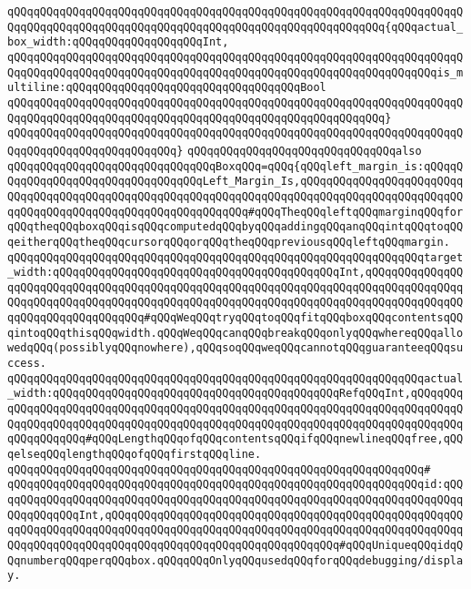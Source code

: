 \verb|qQQqqQQqqQQqqQQqqQQqqQQqqQQqqQQqqQQqqQQqqQQqqQQqqQQqqQQqqQQqqQQqqQQqqQQqqQQqqQQqqQQqqQQqqQQqqQQqqQQqqQQqqQQqqQQqqQQqqQQqqQQqqQQq{qQQqactual_box_width:qQQqqQQqqQQqqQQqqQQqInt,|\newline
\verb|qQQqqQQqqQQqqQQqqQQqqQQqqQQqqQQqqQQqqQQqqQQqqQQqqQQqqQQqqQQqqQQqqQQqqQQqqQQqqQQqqQQqqQQqqQQqqQQqqQQqqQQqqQQqqQQqqQQqqQQqqQQqqQQqqQQqqQQqis_multiline:qQQqqQQqqQQqqQQqqQQqqQQqqQQqqQQqqQQqBool|\newline
\verb|qQQqqQQqqQQqqQQqqQQqqQQqqQQqqQQqqQQqqQQqqQQqqQQqqQQqqQQqqQQqqQQqqQQqqQQqqQQqqQQqqQQqqQQqqQQqqQQqqQQqqQQqqQQqqQQqqQQqqQQqqQQqqQQq}|\newline
\verb|qQQqqQQqqQQqqQQqqQQqqQQqqQQqqQQqqQQqqQQqqQQqqQQqqQQqqQQqqQQqqQQqqQQqqQQqqQQqqQQqqQQqqQQqqQQqqQQq}|\newline
\newline
\verb|qQQqqQQqqQQqqQQqqQQqqQQqqQQqqQQqalso|\newline
\verb|qQQqqQQqqQQqqQQqqQQqqQQqqQQqqQQqBoxqQQq=qQQq{qQQqleft_margin_is:qQQqqQQqqQQqqQQqqQQqqQQqqQQqqQQqqQQqLeft_Margin_Is,qQQqqQQqqQQqqQQqqQQqqQQqqQQqqQQqqQQqqQQqqQQqqQQqqQQqqQQqqQQqqQQqqQQqqQQqqQQqqQQqqQQqqQQqqQQqqQQqqQQqqQQqqQQqqQQqqQQqqQQqqQQqqQQqqQQq#qQQqTheqQQqleftqQQqmarginqQQqforqQQqtheqQQqboxqQQqisqQQqcomputedqQQqbyqQQqaddingqQQqanqQQqintqQQqtoqQQqeitherqQQqtheqQQqcursorqQQqorqQQqtheqQQqpreviousqQQqleftqQQqmargin.|\newline
\verb|qQQqqQQqqQQqqQQqqQQqqQQqqQQqqQQqqQQqqQQqqQQqqQQqqQQqqQQqqQQqqQQqtarget_width:qQQqqQQqqQQqqQQqqQQqqQQqqQQqqQQqqQQqqQQqqQQqInt,qQQqqQQqqQQqqQQqqQQqqQQqqQQqqQQqqQQqqQQqqQQqqQQqqQQqqQQqqQQqqQQqqQQqqQQqqQQqqQQqqQQqqQQqqQQqqQQqqQQqqQQqqQQqqQQqqQQqqQQqqQQqqQQqqQQqqQQqqQQqqQQqqQQqqQQqqQQqqQQqqQQqqQQqqQQqqQQq#qQQqWeqQQqtryqQQqtoqQQqfitqQQqboxqQQqcontentsqQQqintoqQQqthisqQQqwidth.qQQqWeqQQqcanqQQqbreakqQQqonlyqQQqwhereqQQqallowedqQQq(possiblyqQQqnowhere),qQQqsoqQQqweqQQqcannotqQQqguaranteeqQQqsuccess.|\newline
\verb|qQQqqQQqqQQqqQQqqQQqqQQqqQQqqQQqqQQqqQQqqQQqqQQqqQQqqQQqqQQqqQQqactual_width:qQQqqQQqqQQqqQQqqQQqqQQqqQQqqQQqqQQqqQQqqQQqRefqQQqInt,qQQqqQQqqQQqqQQqqQQqqQQqqQQqqQQqqQQqqQQqqQQqqQQqqQQqqQQqqQQqqQQqqQQqqQQqqQQqqQQqqQQqqQQqqQQqqQQqqQQqqQQqqQQqqQQqqQQqqQQqqQQqqQQqqQQqqQQqqQQqqQQqqQQqqQQqqQQqqQQq#qQQqLengthqQQqofqQQqcontentsqQQqifqQQqnewlineqQQqfree,qQQqelseqQQqlengthqQQqofqQQqfirstqQQqline.|\newline
\verb|qQQqqQQqqQQqqQQqqQQqqQQqqQQqqQQqqQQqqQQqqQQqqQQqqQQqqQQqqQQqqQQq#|\newline
\verb|qQQqqQQqqQQqqQQqqQQqqQQqqQQqqQQqqQQqqQQqqQQqqQQqqQQqqQQqqQQqqQQqid:qQQqqQQqqQQqqQQqqQQqqQQqqQQqqQQqqQQqqQQqqQQqqQQqqQQqqQQqqQQqqQQqqQQqqQQqqQQqqQQqqQQqInt,qQQqqQQqqQQqqQQqqQQqqQQqqQQqqQQqqQQqqQQqqQQqqQQqqQQqqQQqqQQqqQQqqQQqqQQqqQQqqQQqqQQqqQQqqQQqqQQqqQQqqQQqqQQqqQQqqQQqqQQqqQQqqQQqqQQqqQQqqQQqqQQqqQQqqQQqqQQqqQQqqQQqqQQqqQQqqQQq#qQQqUniqueqQQqidqQQqnumberqQQqperqQQqbox.qQQqqQQqOnlyqQQqusedqQQqforqQQqdebugging/display.|\newline
